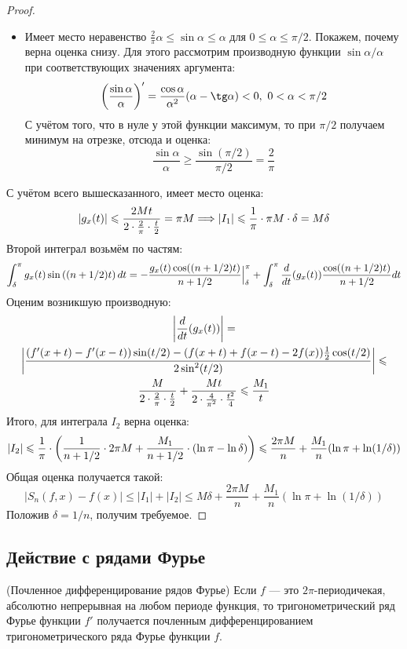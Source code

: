\begin{proof}
\begin{itemize}
		\item Имеет место неравенство $\frac{2}{\pi}\alpha \le \sin \alpha \le \alpha$ для $0 \le \alpha \le \pi / 2$. Покажем, почему верна оценка снизу. Для этого рассмотрим производную функции $\sin \alpha / \alpha$ при соответствующих значениях аргумента:
		\[
			\ps{\frac{\sin \alpha}{\alpha}}' = \frac{\cos \alpha}{\alpha^2}(\alpha - \tg \alpha) < 0,\ 0 < \alpha < \pi / 2
		\]
		С учётом того, что в нуле у этой функции максимум, то при $\pi / 2$ получаем минимум на отрезке, отсюда и оценка:
		\[
			\frac{\sin \alpha}{\alpha} \ge \frac{\sin(\pi / 2)}{\pi / 2} = \frac{2}{\pi}
		\]
	\end{itemize}
 	С учётом всего вышесказанного, имеет место оценка:
 	\[
 		|g_x(t)| \leqslant \frac{2Mt}{2 \cdot \frac{2}{\pi} \cdot \frac{t}{2}} = \pi M \Longrightarrow |I_1| \leqslant \frac{1}{\pi} \cdot \pi M \cdot \delta = M\delta
 	\]
 	Второй интеграл возьмём по частям:
 	\[
 		\int_\delta^\pi g_x(t)\sin\left((n + 1 / 2)t\right)dt = -\frac{g_x(t)\cos((n + 1 / 2)t)}{n + 1 / 2}\Big|_\delta^\pi + \int_\delta^\pi \frac{d}{dt}(g_x(t)) \frac{\cos((n + 1 / 2)t)}{n + 1 / 2}dt
 	\]
 	Оценим возникшую производную:
 	\begin{multline*}
 		\left|\frac{d}{dt}(g_x(t))\right| =
 		\\
 		\left|\frac{(f'(x + t) - f'(x - t))\sin(t / 2) - (f(x + t) + f(x - t) - 2f(x))\frac{1}{2}\cos(t / 2)}{2\sin^2(t / 2)}\right| \leqslant
 		\\
 		\frac{M}{2 \cdot \frac{2}{\pi} \cdot \frac{t}{2}} + \frac{Mt}{2 \cdot \frac{4}{\pi^2} \cdot \frac{t^2}{4}} \leqslant \frac{M_1}{t}
 	\end{multline*}
 	Итого, для интеграла $I_2$ верна оценка:
 	\[
 		|I_2| \leqslant \frac{1}{\pi} \cdot \left(\frac{1}{n + 1 / 2} \cdot 2\pi M + \frac{M_1}{n + 1 / 2} \cdot (\ln \pi - \ln \delta)\right) \leqslant \frac{2\pi M}{n} + \frac{M_1}{n}(\ln \pi + \ln(1 / \delta))
 	\]
 	Общая оценка получается такой:
 	\[
 		|S_n(f, x) - f(x)| \le |I_1| + |I_2| \le M\delta  + \frac{2\pi M}{n} + \frac{M_1}{n}(\ln \pi + \ln(1 / \delta))
 	\]
 	Положив $\delta = 1 / n$, получим требуемое.
\end{proof}

\subsection{Действие с рядами Фурье}

\begin{theorem} (Почленное дифференцирование рядов Фурье) Если $f$ --- это $2\pi$-периодичекая, абсолютно непрерывная на любом периоде функция, то тригонометрический ряд Фурье функции $f'$ получается почленным дифференцированием тригонометрического ряда Фурье функции $f$.
\end{theorem}

